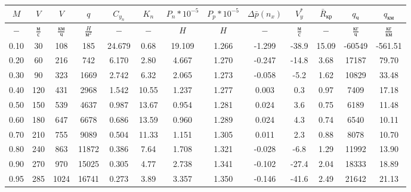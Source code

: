 \begin{tabular}{|c|c|c|c|c|c|c|c|c|c|c|c|c|}
\hline
$M$ & $V$ & $V$ & $q$ & $C_{y_n}$ & $K_n$ & $P_n*10^{-5}$ & $P_p*10^{-5}$ & $\Delta \bar{p}(n_x)$ & $V_y^*$ & $\bar{R}_{кр}$ & $q_{ч}$ & $q_{км}$ \\ 
\hline
$-$ & $\frac{м}{с}$ & $\frac{км}{ч}$ & $\frac{H}{м^2}$ & $-$ & $-$ & $H$ & $H$ & $-$ & $\frac{м}{с}$ & $-$ & $\frac{кг}{ч}$ & $\frac{кг}{км}$ \\ 
\hline
0.10 & 30 & 108 & 185 & 24.679 & 0.68 & 19.109 & 1.266 & -1.299 & -38.9 & 15.09 & -60549 & -561.51 \\ 
\hline
0.20 & 60 & 216 & 742 & 6.170 & 2.80 & 4.667 & 1.270 & -0.247 & -14.8 & 3.68 & 17187 & 79.70 \\ 
\hline
0.30 & 90 & 323 & 1669 & 2.742 & 6.32 & 2.065 & 1.273 & -0.058 & -5.2 & 1.62 & 10829 & 33.48 \\ 
\hline
0.40 & 120 & 431 & 2968 & 1.542 & 10.55 & 1.237 & 1.277 & 0.003 & 0.3 & 0.97 & 7409 & 17.18 \\ 
\hline
0.50 & 150 & 539 & 4637 & 0.987 & 13.67 & 0.954 & 1.281 & 0.024 & 3.6 & 0.75 & 6189 & 11.48 \\ 
\hline
0.60 & 180 & 647 & 6678 & 0.686 & 13.59 & 0.960 & 1.289 & 0.024 & 4.3 & 0.74 & 6540 & 10.11 \\ 
\hline
0.70 & 210 & 755 & 9089 & 0.504 & 11.33 & 1.151 & 1.305 & 0.011 & 2.3 & 0.88 & 8078 & 10.70 \\ 
\hline
0.80 & 240 & 863 & 11872 & 0.386 & 7.64 & 1.708 & 1.321 & -0.028 & -6.8 & 1.29 & 11992 & 13.90 \\ 
\hline
0.90 & 270 & 970 & 15025 & 0.305 & 4.77 & 2.738 & 1.341 & -0.102 & -27.4 & 2.04 & 18333 & 18.89 \\ 
\hline
0.95 & 285 & 1024 & 16741 & 0.273 & 3.89 & 3.357 & 1.350 & -0.146 & -41.6 & 2.49 & 21642 & 21.13 \\ 
\hline
\end{tabular}